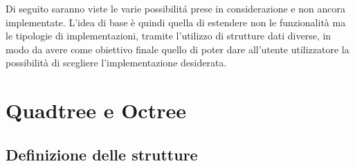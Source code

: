 \large
Di seguito saranno viste le varie possibilit\'a prese in considerazione e non ancora implementate. L'idea di base \`e quindi quella di estendere non le funzionalit\`a ma le tipologie di implementazioni, tramite l'utilizzo di strutture dati diverse, in modo da avere come obiettivo finale quello di poter dare all'utente utilizzatore la possibilit\`a di scegliere l'implementazione desiderata.
\section{Quadtree e Octree}
\subsection{Definizione delle strutture}
